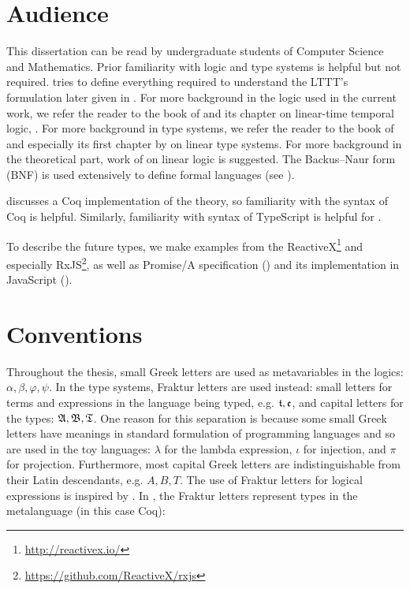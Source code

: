 \section{Audience}

This dissertation can be read by undergraduate students of Computer Science and Mathematics.
Prior familiarity with logic and type systems is helpful but not required.  tries to define everything required to understand the LTTT's formulation later given in . For more background in the logic used in the current work, we refer the reader to the book of \cite{ben-ari2012book} and its chapter on linear-time temporal logic, \cite{Ben-Ari2012}. For more background in type systems, we refer the reader to the book of \cite{10.5555/1076265} and especially its first chapter by \cite{DavidWalker2004} on linear type systems.
For more background in the theoretical part, work of \cite{DBLP:journals/tcs/Girard87} on linear logic is suggested.
The Backus--Naur form (BNF) is used extensively to define formal languages (see \cite{DBLP:conf/ifip/Backus59}).

 discusses a Coq implementation of the theory, so familiarity with the syntax of Coq is helpful. Similarly, familiarity with syntax of TypeScript is helpful for .

To describe the future types, we make examples from the ReactiveX\footnote{\url{http://reactivex.io/}} and especially RxJS\footnote{\url{https://github.com/ReactiveX/rxjs}}, as well as Promise/A specification (\cite{zyp_2010}) and its implementation in JavaScript (\cite{bershanskiy_mills_willee_ribaric_2020}).

\section{Conventions}

Throughout the thesis, small Greek letters are used as metavariables in the logics: $\alpha, \beta, \varphi, \psi$. In the type systems, Fraktur letters are used instead: small letters for terms and expressions in the language being typed, e.g. $\mathfrak{t}, \mathfrak{e}$, and capital letters for the types: $\mathfrak{A}, \mathfrak{B}, \mathfrak{T}$. One reason for this separation is because some small Greek letters have meanings in standard formulation of programming languages and so are used in the toy languages: $\lambda$ for the lambda expression, $\iota$ for injection, and $\pi$ for projection. Furthermore, most capital Greek letters are indistinguishable from their Latin descendants, e.g. $A, B, T$. The use of Fraktur letters for logical expressions is inspired by \cite{hilbert1928}.
In , the Fraktur letters represent types in the metalanguage (in this case Coq):

